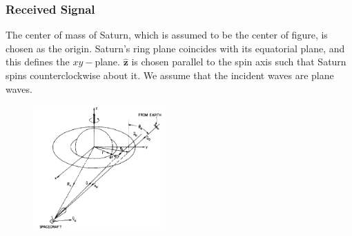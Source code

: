 \documentclass[oneside]{book}
\theoremstyle{mystyle}
\begin{document}
\subsubsection{Received Signal}
\noindent The center of mass of Saturn, which is assumed to be the center of figure, is chosen as the origin. Saturn's ring plane coincides with its equatorial plane, and this defines the $xy-$plane. $\hat{\mathbf{z}}$ is chosen parallel to the spin axis such that Saturn spins counterclockwise about it. We assume that the incident waves are plane waves.
\begin{figure}
	\centering
	\includegraphics[width = 0.45\textwidth]{Marouf81_1}
\end{figure}
\end{document}
